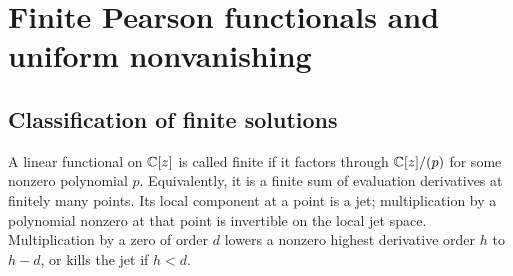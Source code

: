 \section{Finite Pearson functionals and uniform nonvanishing}\label{sec:rank}
\subsection{Classification of finite solutions}
A linear functional on $\mathbb C[z]$ is called finite if it factors through
$\mathbb C[z]/(p)$ for some nonzero polynomial $p$.  Equivalently, it is a finite
sum of evaluation derivatives at finitely many points.  Its local component
at a point is a jet; multiplication by a polynomial nonzero at that point
is invertible on the local jet space.  Multiplication by a zero of order
$d$ lowers a nonzero highest derivative order $h$ to $h-d$, or kills
the jet if $h<d$.

